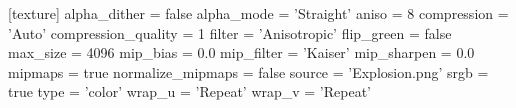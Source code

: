 [texture]
alpha_dither = false
alpha_mode = 'Straight'
aniso = 8
compression = 'Auto'
compression_quality = 1
filter = 'Anisotropic'
flip_green = false
max_size = 4096
mip_bias = 0.0
mip_filter = 'Kaiser'
mip_sharpen = 0.0
mipmaps = true
normalize_mipmaps = false
source = 'Explosion.png'
srgb = true
type = 'color'
wrap_u = 'Repeat'
wrap_v = 'Repeat'